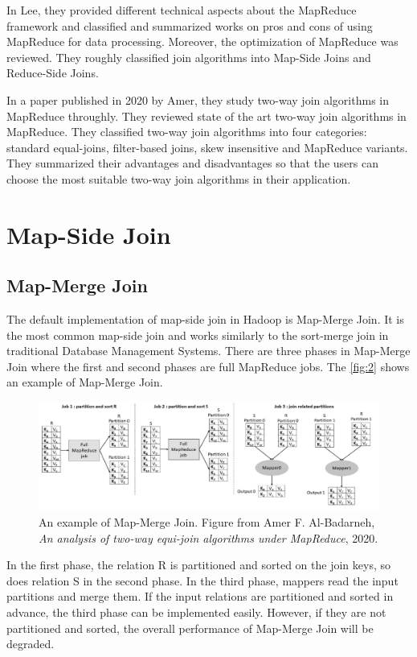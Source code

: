 \documentclass[sigconf, nonacm]{acmart}
\begin{document}
In Lee\cite{lee2012parallel}, they provided different technical aspects about the MapReduce framework and classified and summarized works on pros and cons of using MapReduce for data processing. Moreover, the optimization of MapReduce was reviewed. They roughly classified join algorithms into Map-Side Joins and Reduce-Side Joins.

In a paper published in 2020 by Amer\cite{al2020analysis}, they study two-way join algorithms in MapReduce throughly. They reviewed state of the art two-way join algorithms in MapReduce. They classified two-way join algorithms into four categories: standard equal-joins, filter-based joins, skew insensitive and MapReduce variants. They summarized their advantages and disadvantages so that the users can choose the most suitable two-way join algorithms in their application.

\section{Map-Side Join}

\subsection{Map-Merge Join}

The default implementation of map-side join in Hadoop is Map-Merge Join\cite{lee2012parallel}. It is the most common map-side join and works similarly to the sort-merge join in traditional Database Management Systems. There are three phases in Map-Merge Join where the first and second phases are full MapReduce jobs. The \autoref{fig:2} shows an example of Map-Merge Join. 

\begin{figure}[h!]
  \centering
  \includegraphics[width=\linewidth]{figures/2.png}
  \caption{An example of Map-Merge Join.  Figure from Amer F. Al-Badarneh, \textit{An analysis of two-way equi-join algorithms under MapReduce}, 2020.}
  \label{fig:2}
\end{figure}

In the first phase, the relation R is partitioned and sorted on the join keys, so does relation S in the second phase. In the third phase, mappers read the input partitions and merge them. If the input relations are partitioned and sorted in advance, the third phase can be implemented easily. However, if they are not partitioned and sorted, the overall performance of Map-Merge Join will be degraded.
\end{document}
